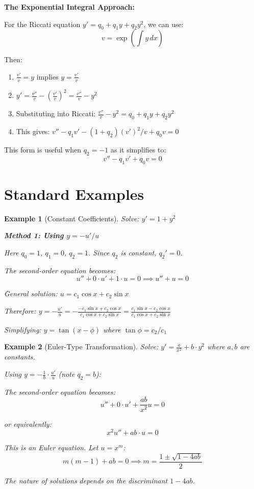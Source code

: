 \documentclass[12pt]{article}
\newtheorem{example}{Example}
\begin{document}
\begin{transformation}
\textbf{The Exponential Integral Approach:}

For the Riccati equation $y' = q_{0} + q_{1} y + q_{2} y^{2}$, we can use:
$$v = \exp\left(\int y \, dx\right)$$

Then:
\begin{enumerate}
    \item $\frac{v'}{v} = y$ implies $y = \frac{v'}{v}$
    \item $y' = \frac{v''}{v} - \left(\frac{v'}{v}\right)^{2} = \frac{v''}{v} - y^{2}$
    \item Substituting into Riccati: $\frac{v''}{v} - y^{2} = q_{0} + q_{1} y + q_{2} y^{2}$
    \item This gives: $v'' - q_{1} v' - (1 + q_{2})(v')^{2}/v + q_{0} v = 0$
\end{enumerate}

This form is useful when $q_{2} = -1$ as it simplifies to:
$$v'' - q_{1} v' + q_{0} v = 0$$
\end{transformation}

\section{Standard Examples}

\begin{example}[Constant Coefficients]
Solve: $y' = 1 + y^{2}$

\textbf{Method 1: Using $y = -u'/u$}

Here $q_{0} = 1$, $q_{1} = 0$, $q_{2} = 1$. Since $q_{2}$ is constant, $q_{2}' = 0$.

The second-order equation becomes:
$$u'' + 0 \cdot u' + 1 \cdot u = 0 \implies u'' + u = 0$$

General solution: $u = c_{1} \cos x + c_{2} \sin x$

Therefore: $y = -\frac{u'}{u} = -\frac{-c_{1} \sin x + c_{2} \cos x}{c_{1} \cos x + c_{2} \sin x} = \frac{c_{1} \sin x - c_{2} \cos x}{c_{1} \cos x + c_{2} \sin x}$

Simplifying: $y = \tan(x - \phi)$ where $\tan \phi = c_{2}/c_{1}$
\end{example}

\begin{example}[Euler-Type Transformation]
Solve: $y' = \frac{a}{x^{2}} + b \cdot y^{2}$ where $a, b$ are constants.

Using $y = -\frac{1}{b} \cdot \frac{u'}{u}$ (note $q_{2} = b$):

The second-order equation becomes:
$$u'' + 0 \cdot u' + \frac{ab}{x^{2}} u = 0$$

or equivalently:
$$x^{2} u'' + ab \cdot u = 0$$

This is an Euler equation. Let $u = x^{m}$:
$$m(m-1) + ab = 0 \implies m = \frac{1 \pm \sqrt{1 - 4ab}}{2}$$

The nature of solutions depends on the discriminant $1 - 4ab$.
\end{example}
\end{document}
